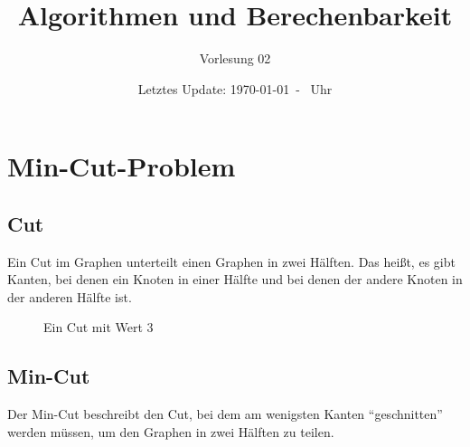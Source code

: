 \documentclass{scrartcl}%
\begin{document}
    \subject{Vorlesungsmitschrieb}
    \title{Algorithmen und Berechenbarkeit}
    \subtitle{Vorlesung 02}
    \date{Letztes Update: \today \ - \currenttime \ Uhr}
    \maketitle

    \section*{Min-Cut-Problem}
    \label{sec:mincutproblem}

    \subsection*{Cut}
    \label{subsec:cut}

    Ein Cut im Graphen unterteilt einen Graphen in zwei Hälften.
    Das heißt, es gibt Kanten, bei denen ein Knoten in einer
    Hälfte und bei denen der andere Knoten in der anderen Hälfte ist.

    \begin{figure}[htb]
        \centering

        \caption*{Ein Cut mit Wert 3}
    \end{figure}

    \subsection*{Min-Cut}
    \label{subsec:mincut}
    Der Min-Cut beschreibt den Cut, bei dem am wenigsten Kanten "`geschnitten"' werden müssen,
    um den Graphen in zwei Hälften zu teilen.
\end{document}
